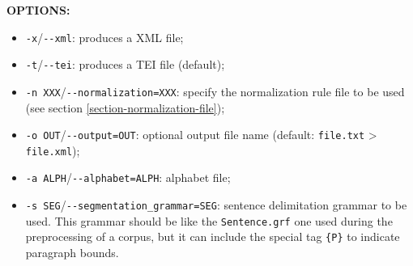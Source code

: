 \bigskip
\noindent \textbf{OPTIONS:}
\begin{itemize}
  \item \verb+-x+/\verb+--xml+: produces a XML file;
  
  \item \verb+-t+/\verb+--tei+: produces a TEI file (default);

  \item \verb+-n XXX+/\verb+--normalization=XXX+: specify the normalization
  rule file to be used (see section \ref{section-normalization-file});

  \item \verb+-o OUT+/\verb+--output=OUT+: optional output file name (default:
  \verb+file.txt+ > \verb+file.xml+);

  \item \verb+-a ALPH+/\verb+--alphabet=ALPH+: alphabet file;
  
  \item \verb+-s SEG+/\verb+--segmentation_grammar=SEG+: sentence delimitation 
  grammar to be used. This grammar should be like the \verb+Sentence.grf+ one used 
  during the preprocessing of a corpus, but it can include the special tag \verb+{P}+ 
  to indicate paragraph bounds.
\end{itemize}


